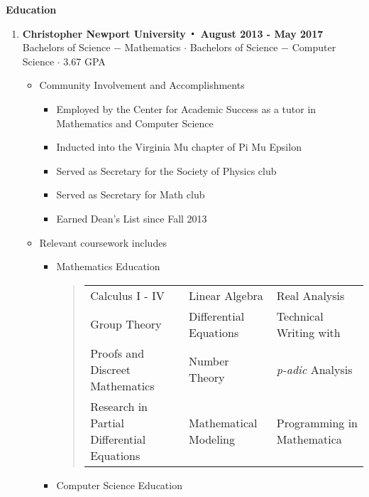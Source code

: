 \noindent\textbf{\large Education}
\begin{enumerate}[label={\Roman*}.]
	\item \textbf{Christopher Newport University $\Bigcdot$ August 2013 - May 2017}\\
	      Bachelors of Science $-$ Mathematics $\cdot$ Bachelors of Science $-$ Computer Science $\cdot$ 3.67 GPA
	      \begin{itemize}
	      	\item Community Involvement and Accomplishments
	      	      \begin{itemize}
	      	      	\item Employed by the Center for Academic Success as a tutor in Mathematics and Computer Science
	      	      	\item Inducted into the Virginia Mu chapter of Pi Mu Epsilon
	      	      	\item Served as Secretary for the Society of Physics club
	      	      	\item Served as Secretary for Math club
	      	      	\item Earned Dean's List since Fall 2013
	      	      \end{itemize}
	      	\item Relevant coursework includes
	      	      \begin{itemize}
	      	      	\item Mathematics Education
	      	      	      \begin{quote}
	      	      	      	\def\arraystretch{1.1}
	      	      	      	\begin{tabular}{l l l}
	      	      	      		Calculus I - IV                            & Linear Algebra         & Real Analysis                         \\
	      	      	      		Group Theory                               & Differential Equations & Technical Writing with \hologo{LaTeX} \\
	      	      	      		Proofs and Discreet Mathematics            & Number Theory          & \textit{p-adic} Analysis              \\
	      	      	      		Research in Partial Differential Equations & Mathematical Modeling  & Programming in Mathematica
	      	      	      	\end{tabular}
	      	      	      \end{quote}
	      	      	\item Computer Science Education
	      	      	      \begin{quote}

\end{quote}
\end{itemize}
\end{itemize}
\end{enumerate}
